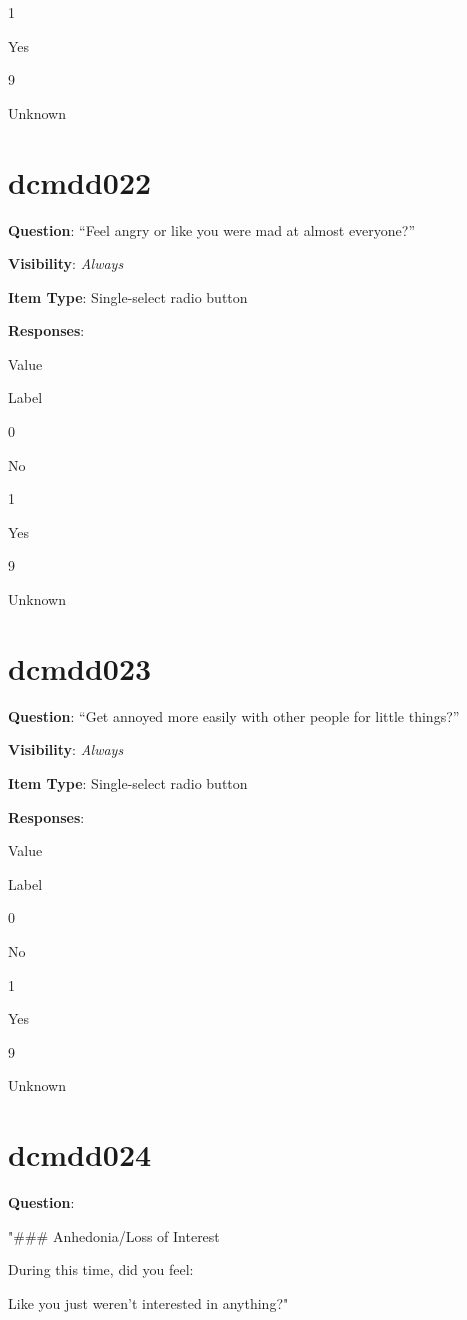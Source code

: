 \documentclass[
]{book}
\begin{document}
1

Yes

9

Unknown

\hypertarget{dcmdd022}{%
\section{dcmdd022}\label{dcmdd022}}

\textbf{Question}: ``Feel angry or like you were mad at almost everyone?''

\textbf{Visibility}: \emph{Always}

\textbf{Item Type}: Single-select radio button

\textbf{Responses}:

Value

Label

0

No

1

Yes

9

Unknown

\hypertarget{dcmdd023}{%
\section{dcmdd023}\label{dcmdd023}}

\textbf{Question}: ``Get annoyed more easily with other people for little things?''

\textbf{Visibility}: \emph{Always}

\textbf{Item Type}: Single-select radio button

\textbf{Responses}:

Value

Label

0

No

1

Yes

9

Unknown

\hypertarget{dcmdd024}{%
\section{dcmdd024}\label{dcmdd024}}

\textbf{Question}:

"\#\#\# Anhedonia/Loss of Interest

During this time, did you feel:

Like you just weren't interested in anything?"
\end{document}
